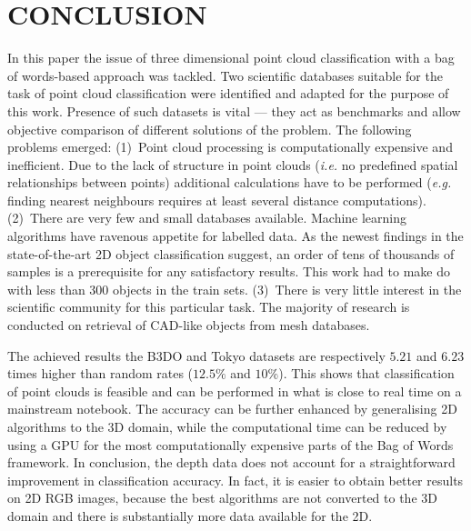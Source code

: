 \documentclass[11pt,twoside]{article}
\begin{document}
\section{ CONCLUSION }

  In this paper the issue of three dimensional point cloud classification with a bag of words-based approach was tackled. Two scientific databases suitable for the task of point cloud classification were identified and adapted for the purpose of this work. Presence of such datasets is vital --- they act as benchmarks and allow objective comparison of different solutions of the problem. The following problems emerged: (1)~Point cloud processing is computationally expensive and inefficient. Due to the lack of structure in point clouds (\textit{i.e.} no predefined spatial relationships between points) additional calculations have to be performed (\textit{e.g.} finding nearest neighbours requires at least several distance computations). (2)~There are very few and small databases available. Machine learning algorithms have ravenous appetite for labelled data. As the newest findings in the state-of-the-art 2D object classification suggest, an order of tens of thousands of samples is a prerequisite for any satisfactory results. This work had to make do with less than 300 objects in the train sets. (3)~There is very little interest in the scientific community for this particular task. The majority of research is conducted on retrieval of CAD-like objects from mesh databases.
  
  The achieved results the B3DO and Tokyo datasets are respectively $5.21$ and $6.23$ times higher than random rates ($12.5\%$ and $10\%$). This shows that classification of point clouds is feasible and can be performed in what is close to real time on a mainstream notebook. The accuracy can be further enhanced by generalising 2D algorithms to the 3D domain, while the computational time can be reduced by using a GPU for the most computationally expensive parts of the Bag of Words framework. In conclusion, the depth data does not account for a straightforward improvement in classification accuracy. In fact, it is easier to obtain better results on 2D RGB images, because the best algorithms are not converted to the 3D domain and there is substantially more data available for the 2D. 


\end{document}
